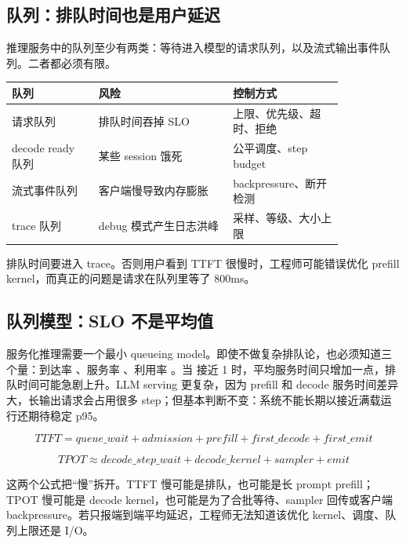 \subsection{队列：排队时间也是用户延迟}

推理服务中的队列至少有两类：等待进入模型的请求队列，以及流式输出事件队列。二者都必须有限。

\begin{center}
\begin{tabular}{p{0.22\linewidth}p{0.34\linewidth}p{0.28\linewidth}}
\toprule
队列 & 风险 & 控制方式 \\
\midrule
请求队列 & 排队时间吞掉 SLO & 上限、优先级、超时、拒绝 \\
decode ready 队列 & 某些 session 饿死 & 公平调度、step budget \\
流式事件队列 & 客户端慢导致内存膨胀 & backpressure、断开检测 \\
trace 队列 & debug 模式产生日志洪峰 & 采样、等级、大小上限 \\
\bottomrule
\end{tabular}
\end{center}

排队时间要进入 trace。否则用户看到 TTFT 很慢时，工程师可能错误优化 prefill kernel，而真正的问题是请求在队列里等了 800ms。

\subsection{队列模型：SLO 不是平均值}

服务化推理需要一个最小 queueing model。即使不做复杂排队论，也必须知道三个量：到达率 \code{\lambda}、服务率 \code{\mu}、利用率 \code{\rho=\lambda/\mu}。当 \code{\rho} 接近 1 时，平均服务时间只增加一点，排队时间可能急剧上升。LLM serving 更复杂，因为 prefill 和 decode 服务时间差异大，长输出请求会占用很多 step；但基本判断不变：系统不能长期以接近满载运行还期待稳定 p95。

\[
TTFT = queue\_wait + admission + prefill + first\_decode + first\_emit
\]

\[
TPOT \approx decode\_step\_wait + decode\_kernel + sampler + emit
\]

这两个公式把“慢”拆开。TTFT 慢可能是排队，也可能是长 prompt prefill；TPOT 慢可能是 decode kernel，也可能是为了合批等待、sampler 回传或客户端 backpressure。若只报端到端平均延迟，工程师无法知道该优化 kernel、调度、队列上限还是 I/O。

